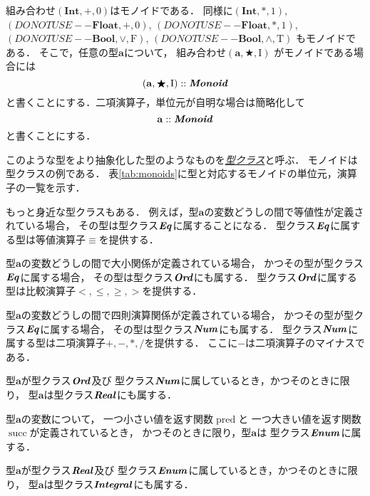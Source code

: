 \documentclass[a5paper,draft]{jsbook}
\newcommand{\keyword}[1]{{\underline{\emph{#1}}}}
\newcommand{\mathConstant}[1]{\mathrm{#1}} %
\newcommand{\mathTypeParameter}[1]{\mathbf{#1}}
\newcommand{\mathTypeName}[1]{\mathbf{#1}}
\newcommand{\mathTypeClass}[1]{\textbf{\emph{#1}}} %
\newcommand{\mathTupleWith}[1]{\left(#1\right)}
\newcommand{\mathTrue}{\mathConstant{T}}
\newcommand{\mathFalse}{\mathConstant{F}}
\DeclareMathOperator{\mathPred}{pred}
\DeclareMathOperator{\mathSucc}{succ}
\newcommand{\mathAnyBinaryOperator}{\mathbin{\bigstar}}
\newcommand{\mathIn}{\mathrel{::}}
\newcommand{\mathMonoid}[3]{(#1,#2,#3)}
\newcommand{\hsklBool}{{DO NOT USE}--\mathTypeParameter{Bool}}
\newcommand{\hsklFloat}{{DO NOT USE}--\mathTypeParameter{Float}}
\begin{document}
組み合わせ$\mathMonoid{\mathTypeName{Int}}{+}{0}$はモノイドである．
同様に$\mathMonoid{\mathTypeName{Int}}{*}{1}$,
$\mathMonoid{\hsklFloat}{+}{0}$,
$\mathMonoid{\hsklFloat}{*}{1}$,
$\mathMonoid{\hsklBool}{\vee}{\mathFalse}$,
$\mathMonoid{\hsklBool}{\wedge}{\mathTrue}$ もモノイドである．
そこで，任意の型$\mathTypeParameter{a}$について，
組み合わせ$\mathTupleWith{\mathTypeParameter{a},\mathAnyBinaryOperator,\mathConstant{I}}$
がモノイドである場合には
\begin{equation}
\mathTupleWith{\mathTypeParameter{a},\mathAnyBinaryOperator,\mathConstant{I}}\mathIn\mathTypeClass{Monoid}
\end{equation}
と書くことにする．二項演算子，単位元が自明な場合は簡略化して
\begin{equation}
\mathTypeParameter{a}\mathIn\mathTypeClass{Monoid}
\end{equation}
と書くことにする．

このような型をより抽象化した型のようなものを\keyword{型クラス}と呼ぶ．
モノイドは型クラスの例である．
表\ref{tab:monoids}に型と対応するモノイドの単位元，演算子の一覧を示す．

もっと身近な型クラスもある．
例えば，型$\mathTypeParameter{a}$の変数どうしの間で等値性が定義されている場合，
その型は型クラス$\mathTypeClass{Eq}$に属することになる．
型クラス$\mathTypeClass{Eq}$に属する型は等値演算子$\equiv$を提供する．

型$\mathTypeParameter{a}$の変数どうしの間で大小関係が定義されている場合，
かつその型が型クラス$\mathTypeClass{Eq}$に属する場合，
その型は型クラス$\mathTypeClass{Ord}$にも属する．
型クラス$\mathTypeClass{Ord}$に属する型は比較演算子$<,\le,\ge,>$を提供する．

型$\mathTypeParameter{a}$の変数どうしの間で四則演算関係が定義されている場合，
かつその型が型クラス$\mathTypeClass{Eq}$に属する場合，
その型は型クラス$\mathTypeClass{Num}$にも属する．
型クラス$\mathTypeClass{Num}$に属する型は二項演算子$+,-,*,/$を提供する．
ここに$-$は二項演算子のマイナスである．

型$\mathTypeParameter{a}$が型クラス$\mathTypeClass{Ord}$及び
型クラス$\mathTypeClass{Num}$に属しているとき，かつそのときに限り，
型$\mathTypeParameter{a}$は型クラス$\mathTypeClass{Real}$にも属する．

型$\mathTypeParameter{a}$の変数について，
一つ小さい値を返す関数$\mathPred$と
一つ大きい値を返す関数$\mathSucc$が定義されているとき，
かつそのときに限り，型$\mathTypeParameter{a}$は
型クラス$\mathTypeClass{Enum}$に属する．

型$\mathTypeParameter{a}$が型クラス$\mathTypeClass{Real}$及び
型クラス$\mathTypeClass{Enum}$に属しているとき，かつそのときに限り，
型$\mathTypeParameter{a}$は型クラス$\mathTypeClass{Integral}$にも属する．
\end{document}
